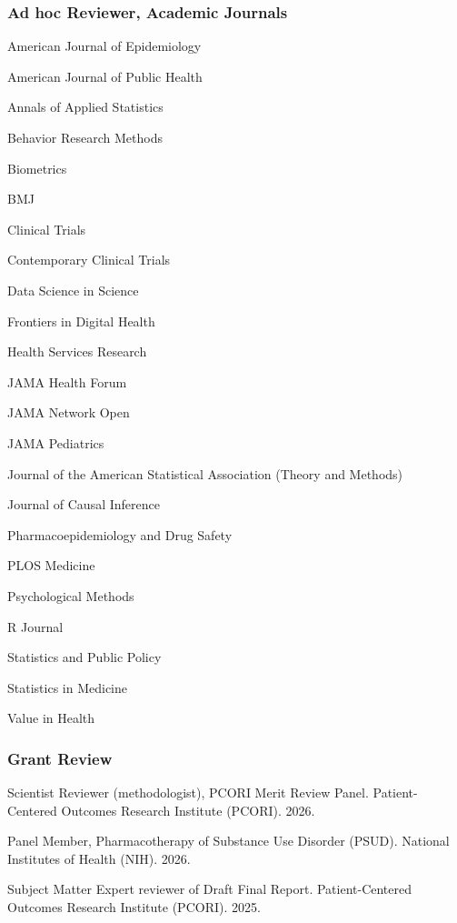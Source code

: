 \documentclass[letterpaper,11pt]{article} %
\begin{document}
	\subsubsection*{Ad hoc Reviewer, Academic Journals}
    \begin{minipage}[l]{1.25em}
        \hfill
    \end{minipage}    
    \begin{minipage}[r]{\linewidth - 1.25em}
        \noindent
        \begin{itemize*}[before=\kern-0.3em, itemjoin={{~\textperiodcentered~}}, afterlabel=\unskip{{~}}]
		\item[] American Journal of Epidemiology
		\item[] American Journal of Public Health
		\item[] Annals of Applied Statistics
		\item[] Behavior Research Methods
        \item[] Biometrics
		\item[] BMJ
		\item[] Clinical Trials
		\item[] Contemporary Clinical Trials
		\item[] Data Science in Science
		\item[] Frontiers in Digital Health
		\item[] Health Services Research
		\item[] JAMA Health Forum
		\item[] JAMA Network Open
		\item[] JAMA Pediatrics
		\item[] Journal of the American Statistical Association (Theory and Methods)
        \item[] Journal of Causal Inference
		\item[] Pharmacoepidemiology and Drug Safety
        \item[] PLOS Medicine
		\item[] Psychological Methods
		\item[] R Journal
		\item[] Statistics and Public Policy
		\item[] Statistics in Medicine
		\item[] Value in Health
	\end{itemize*}
    \end{minipage}

    \subsubsection*{Grant Review}
    \begin{etaremune}
        \item Scientist Reviewer (methodologist), PCORI Merit Review Panel. Patient-Centered Outcomes Research Institute (PCORI). 2026.
        \item Panel Member, Pharmacotherapy of Substance Use Disorder (PSUD). National Institutes of Health (NIH). 2026.
        \item Subject Matter Expert reviewer of Draft Final Report. Patient-Centered Outcomes Research Institute (PCORI). 2025.
    \end{etaremune}
	
\end{document}
